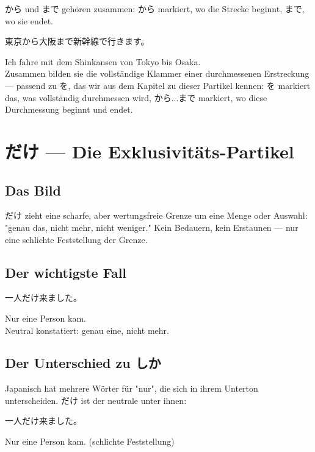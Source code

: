 \documentclass[12pt]{book}
\begin{document}
から und まで gehören zusammen: から markiert, wo die Strecke beginnt, まで, wo sie endet.

\par\quad 東京から大阪まで新幹線で行きます。\\
\par\quad Ich fahre mit dem Shinkansen von Tokyo bis Osaka.\\

Zusammen bilden sie die vollständige Klammer einer durchmessenen Erstreckung — passend zu を, das wir aus dem Kapitel zu dieser Partikel kennen: を markiert das, was vollständig durchmessen wird, から...まで markiert, wo diese Durchmessung beginnt und endet.


\chapter{だけ — Die Exklusivitäts-Partikel}

\section*{Das Bild}

だけ zieht eine scharfe, aber wertungsfreie Grenze um eine Menge oder Auswahl: "genau das, nicht mehr, nicht weniger." Kein Bedauern, kein Erstaunen — nur eine schlichte Feststellung der Grenze.

\section*{Der wichtigste Fall}

\par\quad 一人だけ来ました。\\
\par\quad Nur eine Person kam.\\

Neutral konstatiert: genau eine, nicht mehr.

\section*{Der Unterschied zu しか}

Japanisch hat mehrere Wörter für "nur", die sich in ihrem Unterton unterscheiden. だけ ist der neutrale unter ihnen:

\par\quad 一人だけ来ました。\\
\par\quad Nur eine Person kam. (schlichte Feststellung)\\
\end{document}
